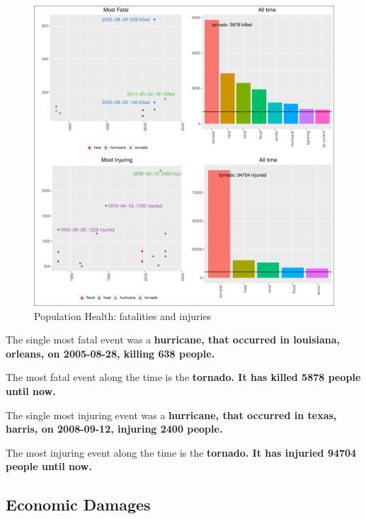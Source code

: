 \documentclass[]{article}
\begin{document}
\begin{figure}[htbp]
\centering
\includegraphics{readme_files/figure-latex/health-plot-1.pdf}
\caption{Population Health: fatalities and injuries}
\end{figure}

The single most fatal event was a \textbf{hurricane, that occurred in
louisiana, orleans, on 2005-08-28, killing 638 people.}

The most fatal event along the time is the \textbf{tornado. It has
killed 5878 people until now.}

The single most injuring event was a \textbf{hurricane, that occurred in
texas, harris, on 2008-09-12, injuring 2400 people.}

The most injuring event along the time is the \textbf{tornado. It has
injuried 94704 people until now.}

\subsection{Economic Damages}\label{economic-damages}
\end{document}

